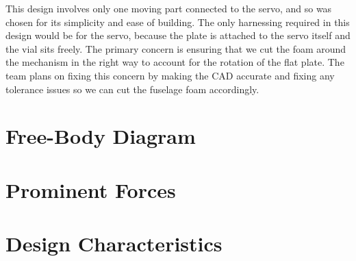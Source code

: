         This design involves only one moving part connected to the servo, and so was chosen for its simplicity and ease of building. The only harnessing required in this design would be for the servo, because the plate is attached to the servo itself and the vial sits freely. The primary concern is ensuring that we cut the foam around the mechanism in the right way to account for the rotation of the flat plate. The team plans on fixing this concern by making the CAD accurate and fixing any tolerance issues so we can cut the fuselage foam accordingly.
    
\section{Free-Body Diagram}

\section{Prominent Forces}

\section{Design Characteristics}

